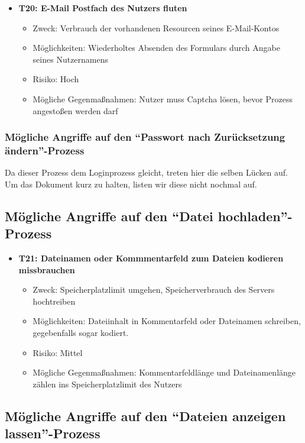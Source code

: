 \documentclass[12pt,DIV14,BCOR10mm,a4paper,parskip=half-,headsepline,headinclude,english,ngerman,bibliography=totocnumbered]{scrreprt}
\begin{document}
\begin{itemize}
  \hypertarget{threat20}{}
  \item \textbf{T20: E-Mail Postfach des Nutzers fluten}
  \begin{itemize}
  \item Zweck: Verbrauch der vorhandenen Resourcen seines E-Mail-Kontos
  \item Möglichkeiten: Wiederholtes Absenden des Formulars durch Angabe seines Nutzernamens
  \item Risiko: Hoch
  \item Mögliche Gegenmaßnahmen: Nutzer muss Captcha lösen, bevor Prozess angestoßen werden darf
  \end{itemize}
\end{itemize}

\subsubsection{Mögliche Angriffe auf den \enquote{Passwort nach Zurücksetzung ändern}-Prozess}

Da dieser Prozess dem Loginprozess gleicht, treten hier die selben Lücken auf.
Um das Dokument kurz zu halten, listen wir diese nicht nochmal auf.

\subsection{Mögliche Angriffe auf den \enquote{Datei hochladen}-Prozess}

\begin{itemize}
  \hypertarget{threat21}{}
  \item \textbf{T21: Dateinamen oder Kommmentarfeld zum Dateien kodieren missbrauchen}
  \begin{itemize}
  \item Zweck: Speicherplatzlimit umgehen, Speicherverbrauch des Servers hochtreiben
  \item Möglichkeiten: Dateiinhalt in Kommentarfeld oder Dateinamen schreiben, gegebenfalls sogar kodiert.
  \item Risiko: Mittel
  \item Mögliche Gegenmaßnahmen: Kommentarfeldlänge und Dateinamenlänge zählen ins Speicherplatzlimit des Nutzers
  \end{itemize}
\end{itemize}

\subsection{Mögliche Angriffe auf den \enquote{Dateien anzeigen lassen}-Prozess}
\end{document}
